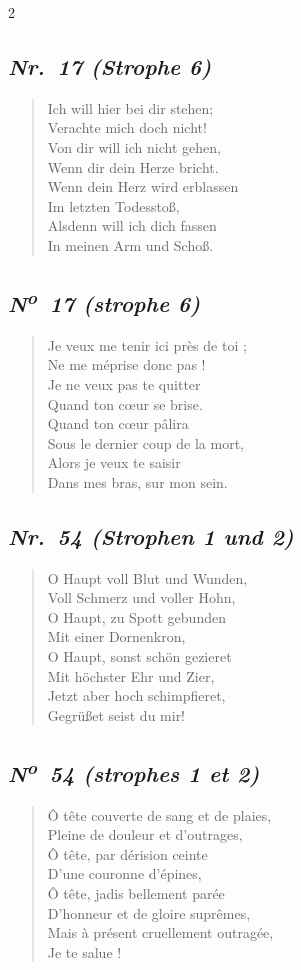 \documentclass[a4paper,12pt]{article}
\newcommand\chunks[2]{%
\begin{leftcolumn*}\begin{otherlanguage}{german}%
{#1}%
\end{otherlanguage}\end{leftcolumn*}%
\begin{rightcolumn}\begin{otherlanguage}{french}%
{#2}%
\end{otherlanguage}\end{rightcolumn}%
}
\newcommand\strophe[1]{\subsection*{\normalsize\normalfont\itshape #1}}
\begin{document}
\begin{paracol}{2}
  \chunks{\strophe{Nr.~17 (Strophe 6)}
          \begin{verse}
          Ich will hier bei dir stehen;\\
          Verachte mich doch nicht!\\
          Von dir will ich nicht gehen,\\
          Wenn dir dein Herze bricht.\\
          Wenn dein Herz wird erblassen\\
          Im letzten Todesstoß,\\
          Alsdenn will ich dich fassen\\
          In meinen Arm und Schoß.
          \end{verse}}
         {\strophe{N\textsuperscript{o}~17 (strophe 6)}
          \begin{verse}
          Je veux me tenir ici près de toi ;\\
          Ne me méprise donc pas !\\
          Je ne veux pas te quitter\\
          Quand ton cœur se brise.\\
          Quand ton cœur pâlira\\
          Sous le dernier coup de la mort,\\
          Alors je veux te saisir\\
          Dans mes bras, sur mon sein.
          \end{verse}}

  \chunks{\strophe{Nr.~54 (Strophen 1 und 2)}
          \begin{verse}
          O Haupt voll Blut und Wunden,\\
          Voll Schmerz und voller Hohn,\\
          O Haupt, zu Spott gebunden\\
          Mit einer Dornenkron,\\
          O Haupt, sonst schön gezieret\\
          Mit höchster Ehr und Zier,\\
          Jetzt aber hoch schimpfieret,\\
          Gegrüßet seist du mir!
          \end{verse}}
         {\strophe{N\textsuperscript{o}~54 (strophes 1 et 2)}
          \begin{verse}
          Ô tête couverte de sang et de plaies,\\
          Pleine de douleur et d’outrages,\\
          Ô tête, par dérision ceinte\\
          D’une couronne d’épines,\\
          Ô tête, jadis bellement parée\\
          D’honneur et de gloire suprêmes,\\
          Mais à présent cruellement outragée,\\
          Je te salue !
          \end{verse}}


\end{paracol}
\end{document}
